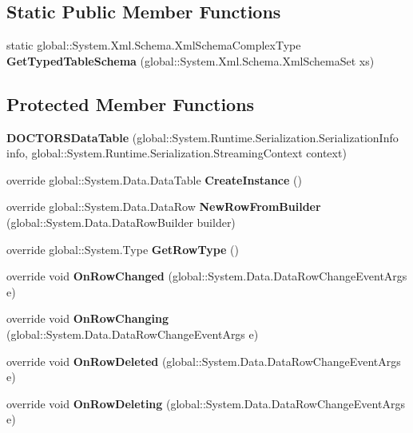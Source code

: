 \subsection*{Static Public Member Functions}
\begin{CompactItemize}
\item 
static global::System.Xml.Schema.XmlSchemaComplexType \textbf{GetTypedTableSchema} (global::System.Xml.Schema.XmlSchemaSet xs)\label{class_automatic_medical_system_1_1_data_set1_1_1_d_o_c_t_o_r_s_data_table_69620b5df96f4d8df8203f6f17fab377}

\end{CompactItemize}
\subsection*{Protected Member Functions}
\begin{CompactItemize}
\item 
\textbf{DOCTORSDataTable} (global::System.Runtime.Serialization.SerializationInfo info, global::System.Runtime.Serialization.StreamingContext context)\label{class_automatic_medical_system_1_1_data_set1_1_1_d_o_c_t_o_r_s_data_table_bcc9dbd11f6a56a18025619a2a2eda31}

\item 
override global::System.Data.DataTable \textbf{CreateInstance} ()\label{class_automatic_medical_system_1_1_data_set1_1_1_d_o_c_t_o_r_s_data_table_af8af3bdcfe64a7c0f109bec1be6f078}

\item 
override global::System.Data.DataRow \textbf{NewRowFromBuilder} (global::System.Data.DataRowBuilder builder)\label{class_automatic_medical_system_1_1_data_set1_1_1_d_o_c_t_o_r_s_data_table_dd35ca4c3680beb90e2d0e363f0d580a}

\item 
override global::System.Type \textbf{GetRowType} ()\label{class_automatic_medical_system_1_1_data_set1_1_1_d_o_c_t_o_r_s_data_table_ac63cf1d6e615ab5aec95b4127394621}

\item 
override void \textbf{OnRowChanged} (global::System.Data.DataRowChangeEventArgs e)\label{class_automatic_medical_system_1_1_data_set1_1_1_d_o_c_t_o_r_s_data_table_a1eed318aed4345838f87c93cc7376a7}

\item 
override void \textbf{OnRowChanging} (global::System.Data.DataRowChangeEventArgs e)\label{class_automatic_medical_system_1_1_data_set1_1_1_d_o_c_t_o_r_s_data_table_cd3caefb858f357eedfc778c361d7b22}

\item 
override void \textbf{OnRowDeleted} (global::System.Data.DataRowChangeEventArgs e)\label{class_automatic_medical_system_1_1_data_set1_1_1_d_o_c_t_o_r_s_data_table_65f650a78acb64c0e1a03f9051416419}

\item 
override void \textbf{OnRowDeleting} (global::System.Data.DataRowChangeEventArgs e)\label{class_automatic_medical_system_1_1_data_set1_1_1_d_o_c_t_o_r_s_data_table_e1cf3cfd8b673a3da97596906b856534}

\end{CompactItemize}
